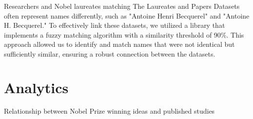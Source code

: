 \documentclass[aspectratio=169,xcolor=dvipsnames]{beamer}
\begin{document}
\begin{frame}{Researchers and Nobel laureates matching}
        The Laureates and Papers Datasets often represent names differently, such as "Antoine Henri Becquerel"
		and "Antoine H. Becquerel." To effectively link these datasets, we utilized a library that implements a
		fuzzy matching algorithm with a similarity threshold of 90\%. This approach allowed us to identify and
		match names that were not identical but sufficiently similar, ensuring a robust connection between the
		datasets.
\end{frame}

\section{Analytics}

\begin{frame}{Relationship between Nobel Prize winning ideas and published studies}
	\begin{columns}[c]
		\begin{table}[H]
			\centering
			\caption{Number of papers per Nobel topic in 2004}
\end{table}
\end{columns}
\end{frame}
\end{document}
